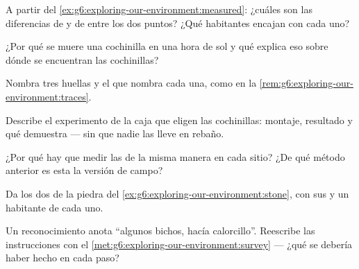 \begin{exercise}[$\star$]\label{exo:g6:exploring-our-environment:4}
A partir del \cref{ex:g6:exploring-our-environment:measured}: ¿cuáles
son las diferencias de  y de  entre los dos puntos? ¿Qué
habitantes encajan con cada uno?
\end{exercise}

\begin{exercise}[$\star$]\label{exo:g6:exploring-our-environment:5}
¿Por qué se muere una cochinilla en una hora de sol y qué explica eso
sobre dónde se encuentran las cochinillas?
\end{exercise}

\begin{exercise}[$\star$]\label{exo:g6:exploring-our-environment:6}
Nombra tres huellas y el  que nombra cada una, como en la
\cref{rem:g6:exploring-our-environment:traces}.
\end{exercise}

\begin{exercise}[$\star\star$]\label{exo:g6:exploring-our-environment:7}
Describe el experimento de la caja que eligen las cochinillas: montaje,
resultado y qué demuestra --- sin que nadie las lleve en rebaño.
\end{exercise}

\begin{exercise}[$\star\star$]\label{exo:g6:exploring-our-environment:8}
¿Por qué hay que medir las  de la misma manera en cada
sitio? ¿De qué método anterior es esta la versión de campo?
\end{exercise}

\begin{exercise}[$\star\star$]\label{exo:g6:exploring-our-environment:9}
Da los dos  de la piedra del
\cref{ex:g6:exploring-our-environment:stone}, con sus  y un
habitante de cada uno.
\end{exercise}

\begin{exercise}[$\star\star$]\label{exo:g6:exploring-our-environment:10}
Un reconocimiento anota ``algunos bichos, hacía calorcillo''. Reescribe
las instrucciones con el \cref{met:g6:exploring-our-environment:survey}
--- ¿qué se debería haber hecho en cada paso?
\end{exercise}


